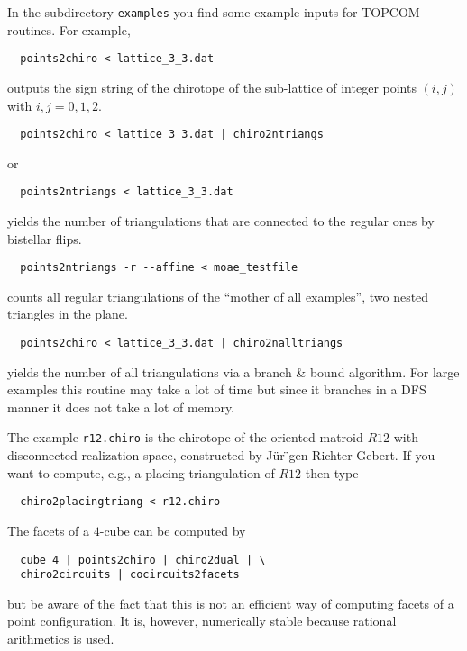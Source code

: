 \documentclass[12pt,a4paper]{article}
\begin{document}
In the subdirectory \texttt{examples} you find some example inputs for TOPCOM
routines.  For example,

\begin{verbatim}
  points2chiro < lattice_3_3.dat
\end{verbatim}

outputs the sign string of the chirotope of the sub-lattice of integer points
$(i,j)$ with $i, j = 0, 1, 2$.

\begin{verbatim}
  points2chiro < lattice_3_3.dat | chiro2ntriangs
\end{verbatim}

or 

\begin{verbatim}
  points2ntriangs < lattice_3_3.dat
\end{verbatim}

yields the number of triangulations that are connected to the regular ones by
bistellar flips.

\begin{verbatim}
  points2ntriangs -r --affine < moae_testfile
\end{verbatim}
counts all regular triangulations of the ``mother of all examples'', two nested 
triangles in the plane.

\begin{verbatim}
  points2chiro < lattice_3_3.dat | chiro2nalltriangs
\end{verbatim}

yields the number of all triangulations via a branch \& bound algorithm.
For large examples this routine may take a lot of time but since it branches in
a DFS manner it does not take a lot of memory.

The example \texttt{r12.chiro} is the chirotope of the oriented matroid $R12$
with disconnected realization space, constructed by J\"ur\"-gen
Richter-Gebert.  If you want to compute, e.g., a placing triangulation of $R12$
then type

\begin{verbatim}
  chiro2placingtriang < r12.chiro
\end{verbatim}

The facets of a $4$-cube can be computed by

\begin{verbatim}
  cube 4 | points2chiro | chiro2dual | \
  chiro2circuits | cocircuits2facets
\end{verbatim}

but be aware of the fact that this is not an efficient way of computing facets
of a point configuration.  It is, however, numerically stable because rational
arithmetics is used.
\end{document}
